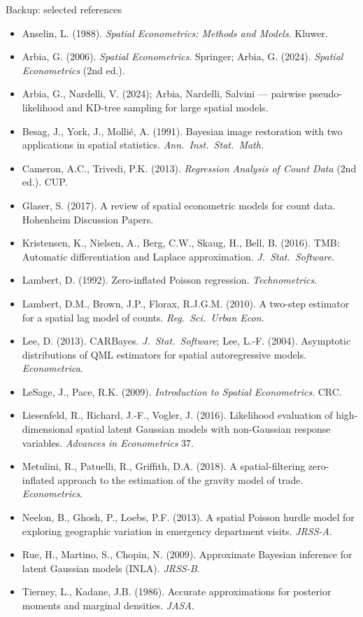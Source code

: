 \documentclass[10pt,aspectratio=169]{beamer}
\begin{document}
\begin{frame}{Backup: selected references}
  \tiny
  \begin{itemize}\setlength{\itemsep}{0.15em}
    \item Anselin, L. (1988). \emph{Spatial Econometrics: Methods and Models}. Kluwer.
    \item Arbia, G. (2006). \emph{Spatial Econometrics}. Springer; Arbia, G. (2024). \emph{Spatial Econometrics} (2nd ed.).
    \item Arbia, G., Nardelli, V. (2024); Arbia, Nardelli, Salvini --- pairwise pseudo-likelihood and KD-tree sampling for large spatial models.
    \item Besag, J., York, J., Mollié, A. (1991). Bayesian image restoration with two applications in spatial statistics. \emph{Ann.\ Inst.\ Stat.\ Math.}
    \item Cameron, A.C., Trivedi, P.K. (2013). \emph{Regression Analysis of Count Data} (2nd ed.). CUP.
    \item Glaser, S. (2017). A review of spatial econometric models for count data. Hohenheim Discussion Papers.
    \item Kristensen, K., Nielsen, A., Berg, C.W., Skaug, H., Bell, B. (2016). TMB: Automatic differentiation and Laplace approximation. \emph{J.\ Stat.\ Software}.
    \item Lambert, D. (1992). Zero-inflated Poisson regression. \emph{Technometrics}.
    \item Lambert, D.M., Brown, J.P., Florax, R.J.G.M. (2010). A two-step estimator for a spatial lag model of counts. \emph{Reg.\ Sci.\ Urban Econ.}
    \item Lee, D. (2013). CARBayes. \emph{J.\ Stat.\ Software}; Lee, L.-F. (2004). Asymptotic distributions of QML estimators for spatial autoregressive models. \emph{Econometrica}.
    \item LeSage, J., Pace, R.K. (2009). \emph{Introduction to Spatial Econometrics}. CRC.
    \item Liesenfeld, R., Richard, J.-F., Vogler, J. (2016). Likelihood evaluation of high-dimensional spatial latent Gaussian models with non-Gaussian response variables. \emph{Advances in Econometrics} 37.
    \item Metulini, R., Patuelli, R., Griffith, D.A. (2018). A spatial-filtering zero-inflated approach to the estimation of the gravity model of trade. \emph{Econometrics}.
    \item Neelon, B., Ghosh, P., Loebs, P.F. (2013). A spatial Poisson hurdle model for exploring geographic variation in emergency department visits. \emph{JRSS-A}.
    \item Rue, H., Martino, S., Chopin, N. (2009). Approximate Bayesian inference for latent Gaussian models (INLA). \emph{JRSS-B}.
    \item Tierney, L., Kadane, J.B. (1986). Accurate approximations for posterior moments and marginal densities. \emph{JASA}.
  \end{itemize}
\end{frame}
\end{document}
